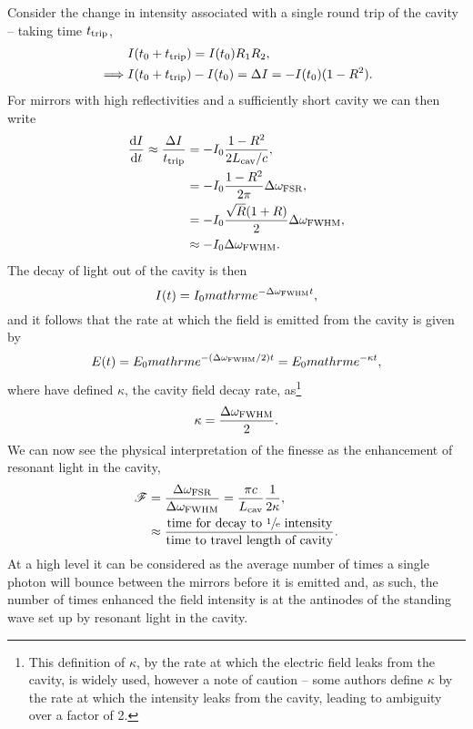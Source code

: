 \documentclass[../Thesis-IJspeert.tex]{subfiles}
\begin{document}
Consider the change in intensity associated with a single round trip of the cavity -- taking time $t_{\mathrm{trip}}$,
\begin{equation}
\begin{aligned}
	&I(t_0 + t_{\mathrm{trip}}) = I(t_0)R_{1}R_{2}, \\
	\implies &I(t_0 + t_{\mathrm{trip}}) - I(t_0) = \Delta I = -I(t_0)(1-R^2).
	\label{eq:FPcavityRoundTripIntChange}
\end{aligned}	
\end{equation}
For mirrors with high reflectivities and a sufficiently short cavity we can then write
\begin{equation}
\begin{aligned}
	\frac{\diffd I}{\diffd t} \approx \frac{\Delta I}{t\sub{trip}} &= -I_0\frac{1-R^2}{2L\sub{cav}/c}, \\
	&= -I_0 \frac{1-R^2}{2\pi}\Delta\omega\sub{FSR}, \\
	&= -I_0 \frac{\sqrt{R}(1+R)}{2}\Delta\omega\sub{FWHM}, \\
	&\approx -I_0 \Delta\omega\sub{FWHM}.
\end{aligned}	
\end{equation}
The decay of light out of the cavity is then
\begin{equation}
	I(t) = I_0 \\mathrm{e}^{-\Delta\omega_{\mathrm{FWHM}}t},
	\label{eq:FPcavityIntensityDecay}
\end{equation}
and it follows that the rate at which the field is emitted from the cavity is given by
\begin{equation}
	E(t) = E_0 \\mathrm{e}^{-\left(\Delta\omega\sub{FWHM}/2\right)t} = E_0 \\mathrm{e}^{-\kappa t},
	\label{eq:FPcavityFieldDecay}
\end{equation}
where have defined $\kappa$, the cavity field decay rate, as\footnote{This definition of $\kappa$, by the rate at which the electric field leaks from the cavity, is widely used, however a note of caution -- some authors define $\kappa$ by the rate at which the intensity leaks from the cavity, leading to ambiguity over a factor of 2.}
\begin{equation}
	\kappa = \frac{\Delta\omega_{\mathrm{FWHM}}}{2}.
	\label{eq:FPcavityKappa}
\end{equation}
We can now see the physical interpretation of the finesse as the enhancement of resonant light in the cavity,
\begin{equation}
\begin{aligned}
	\mathscr{F} &= \frac{\Delta\omega_{\mathrm{FSR}}}{\Delta\omega_{\mathrm{FWHM}}} = \frac{\pi c}{L_{\mathrm{cav}}}	 \frac{1}{2 \kappa}, \\
	&\approx \frac{\text{time for decay to $\sfrac{1}{\mathrm{e}}$ intensity}}{\text{time to travel length of cavity}}.
	\label{eq:FPcavityFinessePhysicalInterpretation}
\end{aligned}
\end{equation}
At a high level it can be considered as the average number of times a single photon will bounce between the mirrors before it is emitted and, as such, the number of times enhanced the field intensity is at the antinodes of the standing wave set up by resonant light    in the cavity.
\end{document}
